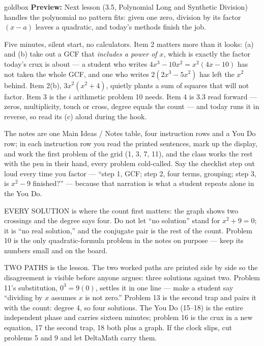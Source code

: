 \documentclass[10pt]{article}
\begin{document}
\begin{skillbox}{goldbox}
\textbf{Preview:} Next lesson (3.5, Polynomial Long and Synthetic Division) handles the
polynomial no pattern fits: given one zero, division by its factor $(x - a)$ leaves a
quadratic, and today's methods finish the job.
\end{skillbox}

\begin{teachernote}[Warm-Up]
Five minutes, silent start, no calculators. Item 2 matters more than it looks: (a) and (b) take
out a GCF that \emph{includes a power of $x$}, which is exactly the factor today's crux is
about --- a student who writes $4x^3 - 10x^2 = x^2(4x - 10)$ has not taken the whole GCF, and one
who writes $2(2x^3 - 5x^2)$ has left the $x^2$ behind. Item 2(b), $3x^2(x^2 + 4)$, quietly
plants a sum of squares that will not factor. Item 3 is the $i$ arithmetic problem 10 needs.
Item 4 is 3.3 read forward --- zeros, multiplicity, touch or cross, degree equals the count ---
and today runs it in reverse, so read its (c) aloud during the hook.
\end{teachernote}

\begin{teachernote}
The notes are one Main Ideas / Notes table, four instruction rows and a You Do row; in each
instruction row you read the printed sentences, mark up the display, and work the first problem
of the grid (1, 3, 7, 11), and the class works the rest with the pen in their hand, every problem
cold-called. Say the checklist step out loud every time you factor --- ``step 1, GCF; step 2,
four terms, grouping; step 3, is $x^2 - 9$ finished?'' --- because that narration is what a
student repeats alone in the You Do.

EVERY SOLUTION is where the count first matters: the graph shows two crossings and the degree
says four. Do not let ``no solution'' stand for $x^2 + 9 = 0$; it is ``no real solution,'' and
the conjugate pair is the rest of the count. Problem 10 is the only quadratic-formula problem
in the notes on purpose --- keep its numbers small and on the board.

TWO PATHS is the lesson. The two worked paths are printed side by side so the disagreement is
visible before anyone argues: three solutions against two. Problem 11's substitution, $0^3 =
9(0)$, settles it in one line --- make a student say ``dividing by $x$ assumes $x$ is not zero.''
Problem 13 is the second trap and pairs it with the count: degree 4, so four solutions. The You
Do (15--18) is the entire independent phase and carries sixteen minutes; problem 16 is the crux
in a new equation, 17 the second trap, 18 both plus a graph. If the clock slips, cut problems 5
and 9 and let DeltaMath carry them.
\end{teachernote}
\end{document}
